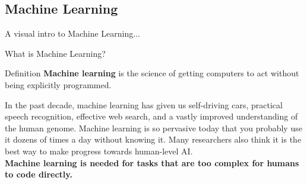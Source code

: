 \documentclass[10pt]{beamer}
\begin{document}
	\subsection{Machine Learning}
	\begin{frame}{A visual intro to Machine Learning...}
	\end{frame}
	\begin{frame}{What is Machine Learning?}
		\begin{center}
			\begin{block}{Definition}
				\textbf{Machine learning} is the science of getting computers to act without being explicitly programmed.
			\end{block}
		\bigskip
			In the past decade, machine learning has given us self-driving cars, practical speech recognition,
			effective web search, and a vastly improved understanding of the human genome. Machine learning is so pervasive today that you
			probably use it dozens of times a day without knowing it. Many
			researchers also think it is the best way to make progress towards
			human-level AI.
			\\
			\textbf{Machine learning is needed for tasks that are too complex for humans to code directly.}
		\end{center} 
	\end{frame}
	
\end{document}
